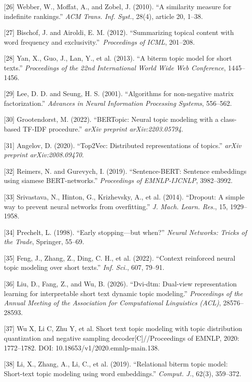 \documentclass{article}
\begin{document}
[26] Webber, W., Moffat, A., and Zobel, J. (2010). ``A similarity measure for indefinite rankings.'' \emph{ACM Trans. Inf. Syst.}, 28(4), article 20, 1--38.

[27] Bischof, J. and Airoldi, E. M. (2012). ``Summarizing topical content with word frequency and exclusivity.''\ \emph{Proceedings of ICML}, 201--208.

[28] Yan, X., Guo, J., Lan, Y., et al. (2013). ``A biterm topic model for short texts.'' \emph{Proceedings of the 22nd International World Wide Web Conference}, 1445--1456.

[29] Lee, D. D. and Seung, H. S. (2001). ``Algorithms for non-negative matrix factorization.'' \emph{Advances in Neural Information Processing Systems}, 556--562.

[30] Grootendorst, M. (2022). ``{BERTopic}: Neural topic modeling with a class-based {TF-IDF} procedure.'' \emph{arXiv preprint arXiv:2203.05794}.

[31] Angelov, D. (2020). ``{Top2Vec}: Distributed representations of topics.'' \emph{arXiv preprint arXiv:2008.09470}.

[32] Reimers, N. and Gurevych, I. (2019). ``Sentence-{BERT}: Sentence embeddings using siamese {BERT}-networks.'' \emph{Proceedings of EMNLP-IJCNLP}, 3982--3992.

[33] Srivastava, N., Hinton, G., Krizhevsky, A., et al. (2014). ``Dropout: A simple way to prevent neural networks from overfitting.'' \emph{J. Mach. Learn. Res.}, 15, 1929--1958.

[34] Prechelt, L. (1998). ``Early stopping---but when?'' \emph{Neural Networks: Tricks of the Trade}, Springer, 55--69.

[35] Feng, J., Zhang, Z., Ding, C. H., et al. (2022). ``Context reinforced neural topic modeling over short texts.'' {\em Inf. Sci.}, 607, 79--91.

[36] Liu, D., Fang, Z., and Wu, B. (2026). ``Dvi-dtm: Dual-view representation learning for interpretable short text dynamic topic modeling.'' \emph{Proceedings of the Annual Meeting of the Association for Computational Linguistics (ACL)}, 28576--28593.

[37] Wu X, Li C, Zhu Y, et al. Short text topic modeling with topic distribution quantization and negative sampling decoder[C]//Proceedings of EMNLP, 2020: 1772--1782. DOI: 10.18653/v1/2020.emnlp-main.138.

[38] Li, X., Zhang, A., Li, C., et al. (2019). ``Relational biterm topic model: Short-text topic modeling using word embeddings.'' \emph{Comput. J.}, 62(3), 359--372.
\end{document}

